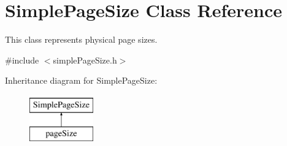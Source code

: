 \hypertarget{classSimplePageSize}{\section{Simple\+Page\+Size Class Reference}
\label{classSimplePageSize}
}


This class represents physical page sizes.  




{\ttfamily \#include $<$simple\+Page\+Size.\+h$>$}

Inheritance diagram for Simple\+Page\+Size\+:\begin{figure}[H]
\begin{center}
\leavevmode
\includegraphics[height=2.000000cm]{classSimplePageSize}
\end{center}
\end{figure}
